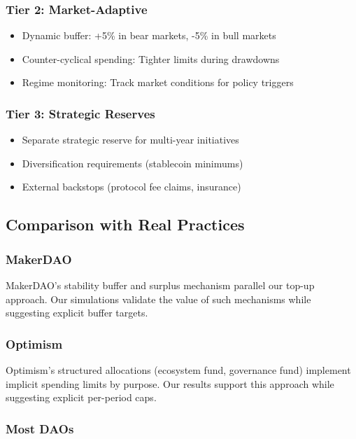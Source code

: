 \subsubsection{Tier 2: Market-Adaptive}

\begin{itemize}
    \item Dynamic buffer: +5\% in bear markets, -5\% in bull markets
    \item Counter-cyclical spending: Tighter limits during drawdowns
    \item Regime monitoring: Track market conditions for policy triggers
\end{itemize}

\subsubsection{Tier 3: Strategic Reserves}

\begin{itemize}
    \item Separate strategic reserve for multi-year initiatives
    \item Diversification requirements (stablecoin minimums)
    \item External backstops (protocol fee claims, insurance)
\end{itemize}

\subsection{Comparison with Real Practices}

\subsubsection{MakerDAO}

MakerDAO's stability buffer and surplus mechanism parallel our top-up approach. Our simulations validate the value of such mechanisms while suggesting explicit buffer targets.

\subsubsection{Optimism}

Optimism's structured allocations (ecosystem fund, governance fund) implement implicit spending limits by purpose. Our results support this approach while suggesting explicit per-period caps.

\subsubsection{Most DAOs}

